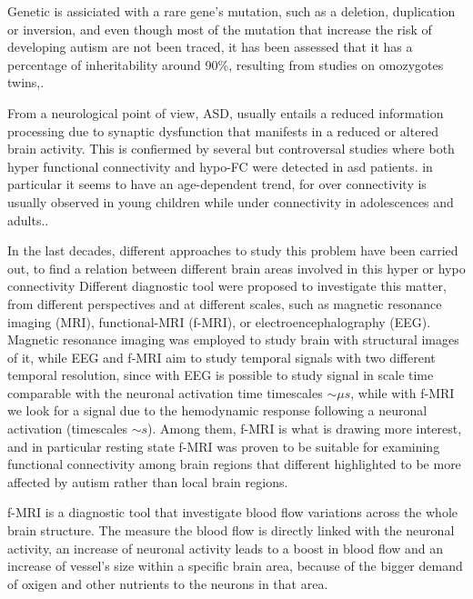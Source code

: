 \documentclass[a4paper,11pt]{article}
\begin{document}
Genetic is assiciated with a rare gene's mutation, such as a deletion, duplication or inversion, and even though most of the mutation that increase the risk of developing autism are not been traced, it has been assessed that it has a percentage of inheritability around 90\%, resulting from studies on omozygotes twins,\cite{freitag-2007}.


From a neurological point of view, ASD, usually entails a reduced information processing due to synaptic dysfunction that manifests in a reduced or altered brain activity. \cite{??}
This is confiermed by several but controversal studies where both hyper functional connectivity and hypo-FC were detected in asd patients.
in particular it seems to have an age-dependent trend, for over connectivity is usually observed in young children while under connectivity in adolescences and adults.\cite{supekar-2013}.

In the last decades, different approaches to study this problem have been carried out, to find a relation between different brain areas involved in this hyper or hypo connectivity
Different diagnostic tool were proposed to investigate this matter, from different perspectives and at different scales, such as magnetic resonance imaging (MRI), functional-MRI (f-MRI), or electroencephalography (EEG).
Magnetic resonance imaging was employed to study brain with structural images of it, while EEG and f-MRI aim to study temporal signals with two different temporal resolution, since with EEG is possible to study signal in scale time comparable with the neuronal activation time timescales $\sim \mu s$, while with f-MRI we look for a signal due to the hemodynamic response following a neuronal activation (timescales $\sim s$).
Among them, f-MRI is what is drawing more interest, and in particular resting state f-MRI was proven to be suitable for examining functional connectivity among brain regions that different highlighted to be more affected by autism rather than local brain regions.

f-MRI is a diagnostic tool that investigate blood flow variations across the whole brain structure.
The measure the blood flow is directly linked with the neuronal activity, an increase of neuronal activity leads to a boost in blood flow and an increase of vessel's size within a specific brain area, because of the bigger demand of oxigen and other nutrients to the neurons in that area.
\end{document}
